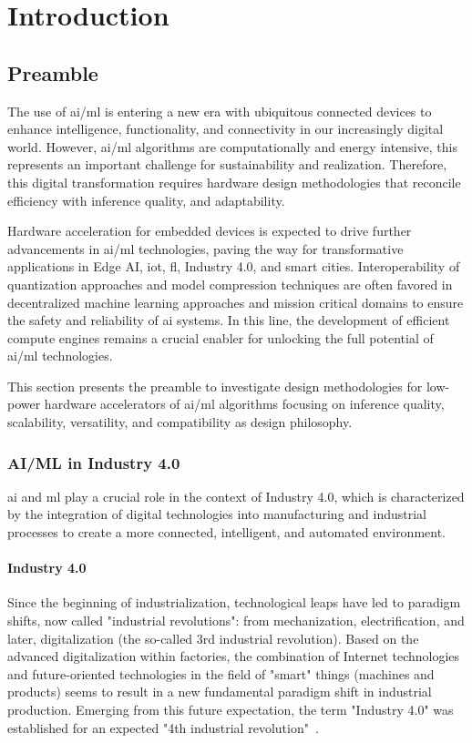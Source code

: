 \chapter{Introduction}\label{chap.intro}
\minitoc
\section{Preamble}
The use of \gls{ai}/\gls{ml} is entering a new era with ubiquitous connected devices to enhance intelligence, functionality, and connectivity in our increasingly digital world. However, \gls{ai}/\gls{ml} algorithms are computationally and energy intensive, this represents an important challenge for sustainability and realization. Therefore, this digital transformation requires hardware design methodologies that reconcile efficiency with inference quality, and adaptability.

Hardware acceleration for embedded devices is expected to drive further advancements in \gls{ai}/\gls{ml} technologies, paving the way for transformative applications in Edge AI, \gls{iot}, \gls{fl}, Industry 4.0, and smart cities. Interoperability of quantization approaches and model compression techniques are often favored in decentralized machine learning approaches and mission critical domains to ensure the safety and reliability of \gls{ai} systems. In this line, the development of efficient compute engines remains a crucial enabler for unlocking the full potential of \gls{ai}/\gls{ml} technologies.

This section presents the preamble to investigate design methodologies for low-power hardware accelerators of \gls{ai}/\gls{ml} algorithms focusing on inference quality, scalability, versatility, and compatibility as design philosophy.

\subsection{AI/ML in Industry 4.0}
\gls{ai} and \gls{ml} play a crucial role in the context of Industry 4.0, which is characterized by the integration of digital technologies into manufacturing and industrial processes to create a more connected, intelligent, and automated environment.

\subsubsection{Industry 4.0}
Since the beginning of industrialization, technological leaps have led to paradigm shifts, now called "industrial revolutions": from mechanization, electrification, and later, digitalization (the so-called 3rd industrial revolution). Based on the advanced digitalization within factories, the combination of Internet technologies and future-oriented technologies in the field of "smart" things (machines and products) seems to result in a new fundamental paradigm shift in industrial production. Emerging from this future expectation, the term "Industry 4.0" was established for an expected "4th industrial revolution"~\cite{lasi2014industry}.


